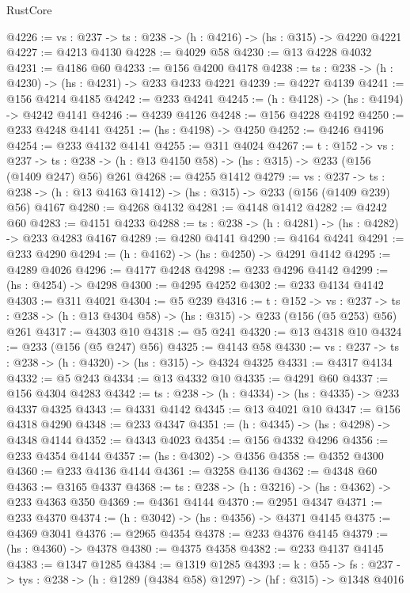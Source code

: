 \begin{lexlean}{RustCore}
\begin{coremodule}
@4226 := {vs : @237} -> {ts : @238} -> (h : @4216) -> (hs : @315) -> @4220 @4221
@4227 := @4213 @4130
@4228 := @4029 @58
@4230 := @13 @4228 @4032
@4231 := @4186 @60
@4233 := @156 @4200 @4178
@4238 := {ts : @238} -> (h : @4230) -> (hs : @4231) -> @233 @4233 @4221
@4239 := @4227 @4139
@4241 := @156 @4214 @4185
@4242 := @233 @4241
@4245 := (h : @4128) -> (hs : @4194) -> @4242 @4141
@4246 := @4239 @4126
@4248 := @156 @4228 @4192
@4250 := @233 @4248 @4141
@4251 := (hs : @4198) -> @4250
@4252 := @4246 @4196
@4254 := @233 @4132 @4141
@4255 := @311 @4024
@4267 := {t : @152} ->
  {vs : @237} ->
  {ts : @238} -> (h : @13 @4150 @58) -> (hs : @315) -> @233 (@156 (@1409 @247) @56) @261
@4268 := @4255 @1412
@4279 := {vs : @237} ->
  {ts : @238} -> (h : @13 @4163 @1412) -> (hs : @315) -> @233 (@156 (@1409 @239) @56) @4167
@4280 := @4268 @4132
@4281 := @4148 @1412
@4282 := @4242 @60
@4283 := @4151 @4233
@4288 := {ts : @238} -> (h : @4281) -> (hs : @4282) -> @233 @4283 @4167
@4289 := @4280 @4141
@4290 := @4164 @4241
@4291 := @233 @4290
@4294 := (h : @4162) -> (hs : @4250) -> @4291 @4142
@4295 := @4289 @4026
@4296 := @4177 @4248
@4298 := @233 @4296 @4142
@4299 := (hs : @4254) -> @4298
@4300 := @4295 @4252
@4302 := @233 @4134 @4142
@4303 := @311 @4021
@4304 := @5 @239
@4316 := {t : @152} ->
  {vs : @237} -> {ts : @238} -> (h : @13 @4304 @58) -> (hs : @315) -> @233 (@156 (@5 @253) @56) @261
@4317 := @4303 @10
@4318 := @5 @241
@4320 := @13 @4318 @10
@4324 := @233 (@156 (@5 @247) @56)
@4325 := @4143 @58
@4330 := {vs : @237} -> {ts : @238} -> (h : @4320) -> (hs : @315) -> @4324 @4325
@4331 := @4317 @4134
@4332 := @5 @243
@4334 := @13 @4332 @10
@4335 := @4291 @60
@4337 := @156 @4304 @4283
@4342 := {ts : @238} -> (h : @4334) -> (hs : @4335) -> @233 @4337 @4325
@4343 := @4331 @4142
@4345 := @13 @4021 @10
@4347 := @156 @4318 @4290
@4348 := @233 @4347
@4351 := (h : @4345) -> (hs : @4298) -> @4348 @4144
@4352 := @4343 @4023
@4354 := @156 @4332 @4296
@4356 := @233 @4354 @4144
@4357 := (hs : @4302) -> @4356
@4358 := @4352 @4300
@4360 := @233 @4136 @4144
@4361 := @3258 @4136
@4362 := @4348 @60
@4363 := @3165 @4337
@4368 := {ts : @238} -> (h : @3216) -> (hs : @4362) -> @233 @4363 @350
@4369 := @4361 @4144
@4370 := @2951 @4347
@4371 := @233 @4370
@4374 := (h : @3042) -> (hs : @4356) -> @4371 @4145
@4375 := @4369 @3041
@4376 := @2965 @4354
@4378 := @233 @4376 @4145
@4379 := (hs : @4360) -> @4378
@4380 := @4375 @4358
@4382 := @233 @4137 @4145
@4383 := @1347 @1285
@4384 := @1319 @1285
@4393 := {k : @55} ->
  {fs : @237} -> {tys : @238} -> (h : @1289 (@4384 @58) @1297) -> (hf : @315) -> @1348 @4016

\end{coremodule}
\end{lexlean}
